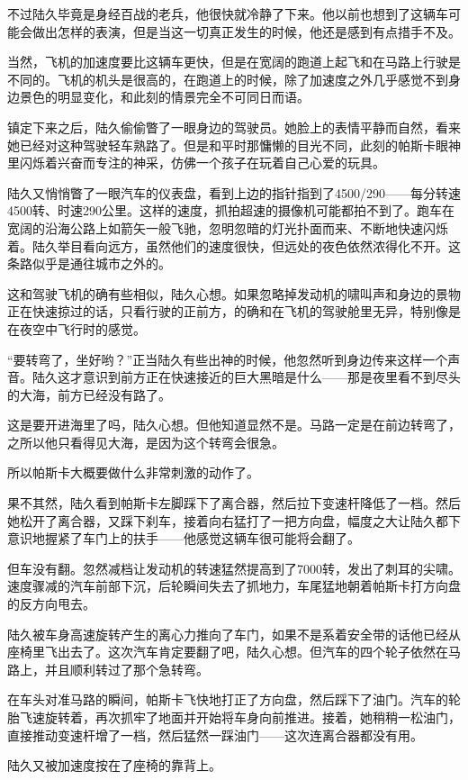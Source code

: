 不过陆久毕竟是身经百战的老兵，他很快就冷静了下来。他以前也想到了这辆车可能会做出怎样的表演，但是当这一切真正发生的时候，他还是感到有点措手不及。

当然，飞机的加速度要比这辆车更快，但是在宽阔的跑道上起飞和在马路上行驶是不同的。飞机的机头是很高的，在跑道上的时候，除了加速度之外几乎感觉不到身边景色的明显变化，和此刻的情景完全不可同日而语。

镇定下来之后，陆久偷偷瞥了一眼身边的驾驶员。她脸上的表情平静而自然，看来她已经对这种驾驶轻车熟路了。但是和平时那慵懒的目光不同，此刻的帕斯卡眼神里闪烁着兴奋而专注的神采，仿佛一个孩子在玩着自己心爱的玩具。

陆久又悄悄瞥了一眼汽车的仪表盘，看到上边的指针指到了4500/290——每分转速4500转、时速290公里。这样的速度，抓拍超速的摄像机可能都拍不到了。跑车在宽阔的沿海公路上如箭矢一般飞驰，忽明忽暗的灯光扑面而来、不断地快速闪烁着。陆久举目看向远方，虽然他们的速度很快，但远处的夜色依然浓得化不开。这条路似乎是通往城市之外的。

这和驾驶飞机的确有些相似，陆久心想。如果忽略掉发动机的啸叫声和身边的景物正在快速掠过的话，只看行驶的正前方，的确和在飞机的驾驶舱里无异，特别像是在夜空中飞行时的感觉。

“要转弯了，坐好哟？”正当陆久有些出神的时候，他忽然听到身边传来这样一个声音。陆久这才意识到前方正在快速接近的巨大黑暗是什么——那是夜里看不到尽头的大海，前方已经没有路了。

这是要开进海里了吗，陆久心想。但他知道显然不是。马路一定是在前边转弯了，之所以他只看得见大海，是因为这个转弯会很急。

所以帕斯卡大概要做什么非常刺激的动作了。

果不其然，陆久看到帕斯卡左脚踩下了离合器，然后拉下变速杆降低了一档。然后她松开了离合器，又踩下刹车，接着向右猛打了一把方向盘，幅度之大让陆久都下意识地握紧了车门上的扶手——他感觉这辆车很可能将会翻了。

但车没有翻。忽然减档让发动机的转速猛然提高到了7000转，发出了刺耳的尖啸。速度骤减的汽车前部下沉，后轮瞬间失去了抓地力，车尾猛地朝着帕斯卡打方向盘的反方向甩去。

陆久被车身高速旋转产生的离心力推向了车门，如果不是系着安全带的话他已经从座椅里飞出去了。这次汽车肯定要翻了吧，陆久心想。但汽车的四个轮子依然在马路上，并且顺利转过了那个急转弯。

在车头对准马路的瞬间，帕斯卡飞快地打正了方向盘，然后踩下了油门。汽车的轮胎飞速旋转着，再次抓牢了地面并开始将车身向前推进。接着，她稍稍一松油门，直接推动变速杆增了一档，然后猛然一踩油门——这次连离合器都没有用。

陆久又被加速度按在了座椅的靠背上。

